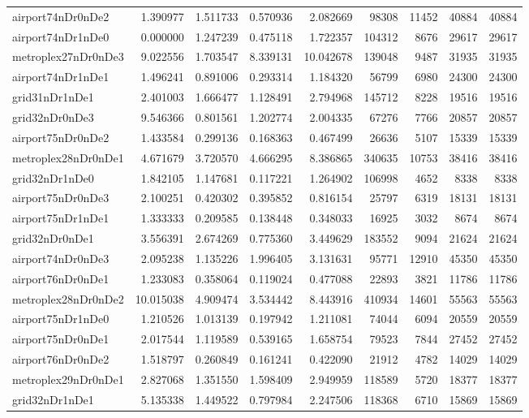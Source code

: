 \begin{longtable}{|l|r|r|r|r|r|r|r|r|}
airport74nDr0nDe2 & 1.390977 & 1.511733 & 0.570936 & 2.082669 & 98308 & 11452 & 40884 & 40884 \\
airport74nDr1nDe0 & 0.000000 & 1.247239 & 0.475118 & 1.722357 & 104312 & 8676 & 29617 & 29617 \\
metroplex27nDr0nDe3 & 9.022556 & 1.703547 & 8.339131 & 10.042678 & 139048 & 9487 & 31935 & 31935 \\
airport74nDr1nDe1 & 1.496241 & 0.891006 & 0.293314 & 1.184320 & 56799 & 6980 & 24300 & 24300 \\
grid31nDr1nDe1 & 2.401003 & 1.666477 & 1.128491 & 2.794968 & 145712 & 8228 & 19516 & 19516 \\
grid32nDr0nDe3 & 9.546366 & 0.801561 & 1.202774 & 2.004335 & 67276 & 7766 & 20857 & 20857 \\
airport75nDr0nDe2 & 1.433584 & 0.299136 & 0.168363 & 0.467499 & 26636 & 5107 & 15339 & 15339 \\
metroplex28nDr0nDe1 & 4.671679 & 3.720570 & 4.666295 & 8.386865 & 340635 & 10753 & 38416 & 38416 \\
grid32nDr1nDe0 & 1.842105 & 1.147681 & 0.117221 & 1.264902 & 106998 & 4652 & 8338 & 8338 \\
airport75nDr0nDe3 & 2.100251 & 0.420302 & 0.395852 & 0.816154 & 25797 & 6319 & 18131 & 18131 \\
airport75nDr1nDe1 & 1.333333 & 0.209585 & 0.138448 & 0.348033 & 16925 & 3032 & 8674 & 8674 \\
grid32nDr0nDe1 & 3.556391 & 2.674269 & 0.775360 & 3.449629 & 183552 & 9094 & 21624 & 21624 \\
airport74nDr0nDe3 & 2.095238 & 1.135226 & 1.996405 & 3.131631 & 95771 & 12910 & 45350 & 45350 \\
airport76nDr0nDe1 & 1.233083 & 0.358064 & 0.119024 & 0.477088 & 22893 & 3821 & 11786 & 11786 \\
metroplex28nDr0nDe2 & 10.015038 & 4.909474 & 3.534442 & 8.443916 & 410934 & 14601 & 55563 & 55563 \\
airport75nDr1nDe0 & 1.210526 & 1.013139 & 0.197942 & 1.211081 & 74044 & 6094 & 20559 & 20559 \\
airport75nDr0nDe1 & 2.017544 & 1.119589 & 0.539165 & 1.658754 & 79523 & 7844 & 27452 & 27452 \\
airport76nDr0nDe2 & 1.518797 & 0.260849 & 0.161241 & 0.422090 & 21912 & 4782 & 14029 & 14029 \\
metroplex29nDr0nDe1 & 2.827068 & 1.351550 & 1.598409 & 2.949959 & 118589 & 5720 & 18377 & 18377 \\
grid32nDr1nDe1 & 5.135338 & 1.449522 & 0.797984 & 2.247506 & 118368 & 6710 & 15869 & 15869 \\

\end{longtable}

